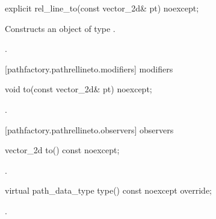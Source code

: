 \begin{itemdecl}
    explicit rel_line_to(const vector_2d& pt) noexcept;
\end{itemdecl}
\begin{itemdescr}
	\pnum
	\effects
	Constructs an object of type .
	
	\pnum
	\postconditions
	.
\end{itemdescr}

 [pathfactory.pathrellineto.modifiers]{ modifiers}

\begin{itemdecl}
    void to(const vector_2d& pt) noexcept;
\end{itemdecl}
\begin{itemdescr}
	\pnum
	\postconditions
	.
\end{itemdescr}

 [pathfactory.pathrellineto.observers]{ observers}

\begin{itemdecl}
    vector_2d to() const noexcept;
\end{itemdecl}
\begin{itemdescr}
	\pnum
	\returns
	.
\end{itemdescr}

\begin{itemdecl}
    virtual path_data_type type() const noexcept override;
\end{itemdecl}
\begin{itemdescr}
	\pnum
	\returns
	.
\end{itemdescr}

